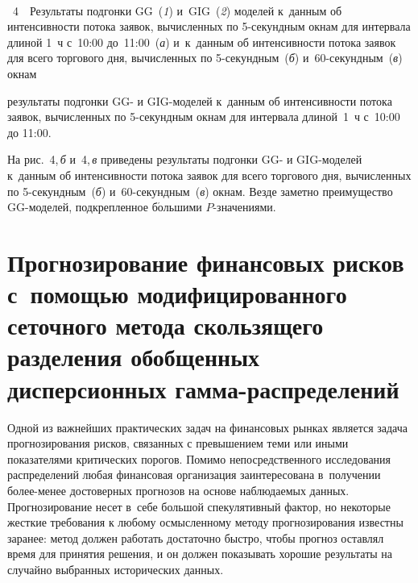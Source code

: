\begin{multicols}{2}
\pagebreak

\begin{center}  %
\vspace*{-12pt}
\mbox{%
 \epsfxsize=78.233mm
 }

\end{center}

\vspace*{-6pt}

\noindent
{{\figurename~4}\ \ \small{Результаты подгонки GG~(\textit{1}) и~GIG~(\textit{2}) мо\-де\-лей к~данным
об интенсивности потока заявок, вычисленных по 5-се\-кунд\-ным окнам для
интервала длиной 1~ч с~10:00 до~11:00~(\textit{а}) и~к~данным 
об интенсивности потока заявок
для всего торгового дня, вычисленных по 5-се\-кунд\-ным~(\textit{б}) 
и~60-се\-кунд\-ным~(\textit{в}) окнам}}
 


\vspace*{24pt}


\addtocounter{figure}{1}




\noindent
 результаты подгонки GG- и GIG-мо\-де\-лей 
к~данным об интенсивности потока заявок, вычисленных по 5-се\-кунд\-ным
окнам для интервала длиной~1~ч с~10:00 до 11:00. 

На рис.~4,\,\textit{б} и~4,\,\textit{в}
приведены результаты подгонки GG- и GIG-мо\-де\-лей к~данным об
интенсивности потока заявок для всего торгового дня, вычисленных по
5-се\-кунд\-ным~(\textit{б}) и~60-се\-кунд\-ным~(\textit{в}) окнам. Везде заметно
преимущество GG-мо\-де\-лей, подкрепленное б$\acute{\mbox{о}}$льшими $P$-зна\-че\-ниями.



\section{Прогнозирование финансовых рисков с~помощью модифицированного
сеточного метода скользящего разделения обобщенных дисперсионных
гамма-распределений}

Одной из важнейших практических задач на финансовых рынках является
задача прогнозирования рисков, связанных с превышением теми или
иными показателями критических порогов. Помимо непосредственного
исследования распределений любая финансовая организация
заинтересована в~получении бо\-лее-ме\-нее достоверных прогнозов на
основе наблюдаемых данных. Прогнозирование несет в~себе большой
спекулятивный фактор, но некоторые жесткие требования к любому
осмысленному методу прогнозирования известны заранее: метод должен
работать достаточно быстро, чтобы прогноз оставлял время для
принятия решения, и он должен показывать хорошие результаты на
случайно выбранных исторических данных.


\end{multicols}
